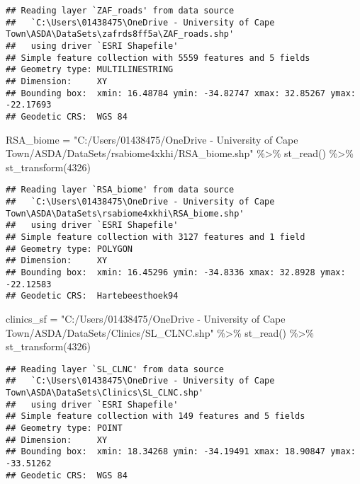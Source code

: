\documentclass[
]{book}
\newenvironment{Shaded}{\begin{snugshade}}{\end{snugshade}}
\newcommand{\DecValTok}[1]{\textcolor[rgb]{0.00,0.00,0.81}{#1}}
\newcommand{\FunctionTok}[1]{\textcolor[rgb]{0.00,0.00,0.00}{#1}}
\newcommand{\NormalTok}[1]{#1}
\newcommand{\OtherTok}[1]{\textcolor[rgb]{0.56,0.35,0.01}{#1}}
\newcommand{\SpecialCharTok}[1]{\textcolor[rgb]{0.00,0.00,0.00}{#1}}
\newcommand{\StringTok}[1]{\textcolor[rgb]{0.31,0.60,0.02}{#1}}
\begin{document}
\begin{verbatim}
## Reading layer `ZAF_roads' from data source 
##   `C:\Users\01438475\OneDrive - University of Cape Town\ASDA\DataSets\zafrds8ff5a\ZAF_roads.shp' 
##   using driver `ESRI Shapefile'
## Simple feature collection with 5559 features and 5 fields
## Geometry type: MULTILINESTRING
## Dimension:     XY
## Bounding box:  xmin: 16.48784 ymin: -34.82747 xmax: 32.85267 ymax: -22.17693
## Geodetic CRS:  WGS 84
\end{verbatim}

\begin{Shaded}
\begin{Highlighting}[]
\NormalTok{RSA\_biome }\OtherTok{=} \StringTok{"C:/Users/01438475/OneDrive {-} University of Cape Town/ASDA/DataSets/rsabiome4xkhi/RSA\_biome.shp"} \SpecialCharTok{\%\textgreater{}\%} 
  \FunctionTok{st\_read}\NormalTok{() }\SpecialCharTok{\%\textgreater{}\%} \FunctionTok{st\_transform}\NormalTok{(}\DecValTok{4326}\NormalTok{)}
\end{Highlighting}
\end{Shaded}

\begin{verbatim}
## Reading layer `RSA_biome' from data source 
##   `C:\Users\01438475\OneDrive - University of Cape Town\ASDA\DataSets\rsabiome4xkhi\RSA_biome.shp' 
##   using driver `ESRI Shapefile'
## Simple feature collection with 3127 features and 1 field
## Geometry type: POLYGON
## Dimension:     XY
## Bounding box:  xmin: 16.45296 ymin: -34.8336 xmax: 32.8928 ymax: -22.12583
## Geodetic CRS:  Hartebeesthoek94
\end{verbatim}

\begin{Shaded}
\begin{Highlighting}[]
\NormalTok{clinics\_sf }\OtherTok{=} \StringTok{"C:/Users/01438475/OneDrive {-} University of Cape Town/ASDA/DataSets/Clinics/SL\_CLNC.shp"} \SpecialCharTok{\%\textgreater{}\%} 
  \FunctionTok{st\_read}\NormalTok{() }\SpecialCharTok{\%\textgreater{}\%} \FunctionTok{st\_transform}\NormalTok{(}\DecValTok{4326}\NormalTok{)}
\end{Highlighting}
\end{Shaded}

\begin{verbatim}
## Reading layer `SL_CLNC' from data source 
##   `C:\Users\01438475\OneDrive - University of Cape Town\ASDA\DataSets\Clinics\SL_CLNC.shp' 
##   using driver `ESRI Shapefile'
## Simple feature collection with 149 features and 5 fields
## Geometry type: POINT
## Dimension:     XY
## Bounding box:  xmin: 18.34268 ymin: -34.19491 xmax: 18.90847 ymax: -33.51262
## Geodetic CRS:  WGS 84
\end{verbatim}
\end{document}
